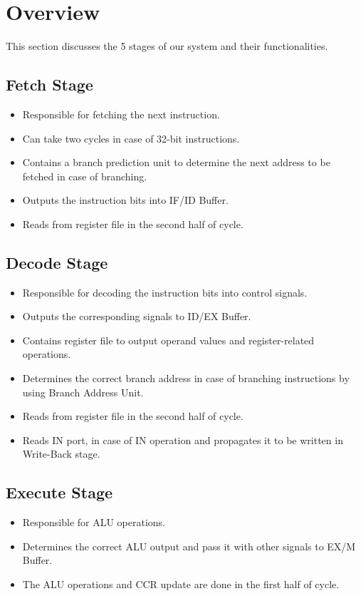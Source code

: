 \section{Overview}
This section discusses the 5 stages of our system and their functionalities.

\subsection{Fetch Stage}
\begin{itemize}
    \item Responsible for fetching the next instruction.
    \item Can take two cycles in case of 32-bit instructions.
    \item Contains a branch prediction unit to determine the next address to be fetched in case of branching.
    \item Outputs the instruction bits into IF/ID Buffer.
    \item Reads from register file in the second half of cycle.
\end{itemize}

\subsection{Decode Stage}
\begin{itemize}
    \item Responsible for decoding the instruction bits into control signals.
    \item Outputs the corresponding signals to ID/EX Buffer.
    \item Contains register file to output operand values and register-related operations.
    \item Determines the correct branch address in case of branching instructions by using Branch Address Unit.
    \item Reads from register file in the second half of cycle.
    \item Reads IN port, in case of IN operation and propagates it to be written in Write-Back stage.
\end{itemize}

\subsection{Execute Stage}
\begin{itemize}
    \item Responsible for ALU operations.
    \item Determines the correct ALU output and pass it with other signals to EX/M Buffer.
    \item The ALU operations and CCR update are done in the first half of cycle.
\end{itemize}

